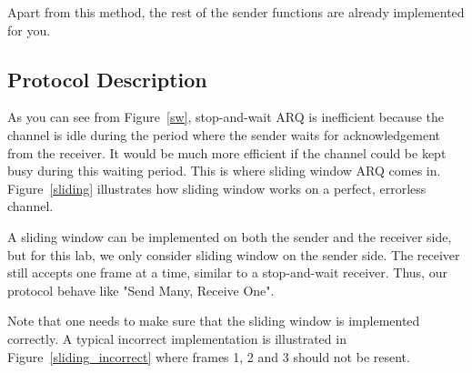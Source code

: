 \documentclass[11pt]{article}
\begin{document}
Apart from this method, the rest of the sender functions are already implemented for you.


\subsection{Protocol Description}
\label{sec:protocol}
As you can see from Figure~\ref{sw}, stop-and-wait ARQ is inefficient because the channel is idle during the period where the sender waits for acknowledgement from the receiver.
It would be much more efficient if the channel could be kept busy during this waiting period.
This is where sliding window ARQ comes in. Figure~\ref{sliding} illustrates how sliding window works on a perfect, errorless channel.

A sliding window can be implemented on both the sender and the receiver side, but for this lab, we only consider sliding window on the sender side.
The receiver still accepts one frame at a time, similar to a stop-and-wait receiver.
Thus, our protocol behave like "Send Many, Receive One".

Note that one needs to make sure that the sliding window is implemented correctly.
A typical incorrect implementation is illustrated in Figure~\ref{sliding_incorrect} where frames 1, 2 and 3 should not be resent.
\end{document}
